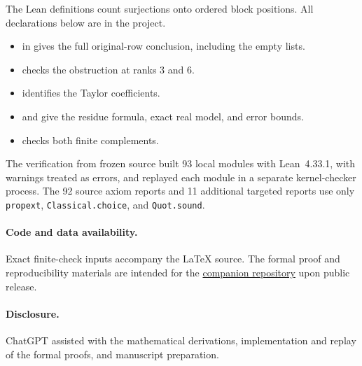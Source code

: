 \documentclass[11pt]{article}
\begin{document}
The Lean definitions count surjections onto ordered block positions.
All declarations below are in the  project.
\begin{itemize}
 \item {} in 
   gives the full original-row conclusion, including the empty lists.
 \item {} checks the obstruction at ranks 3 and 6.
 \item {} identifies the Taylor coefficients.
 \item {} and  give the
   residue formula, exact real model, and error bounds.
 \item {} checks both finite complements.
\end{itemize}
The verification from frozen source built 93 local modules with Lean~4.33.1,
with warnings treated as errors, and replayed each module in a separate
kernel-checker process. The 92 source axiom reports and 11 additional
targeted reports use only \texttt{propext}, \texttt{Classical.choice},
and \texttt{Quot.sound}.

\paragraph{Code and data availability.}
Exact finite-check inputs accompany the LaTeX source. The formal
proof and reproducibility materials are intended for the
\href{https://github.com/AlexZander-666/ordered-partition-large-blocks}{companion repository}
upon public release.

\paragraph{Disclosure.}
ChatGPT assisted with the mathematical derivations, implementation and replay of the
formal proofs, and manuscript preparation.
\end{document}
